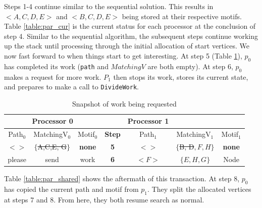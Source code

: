 \documentclass[12pt,twoside]{reedthesis}
\begin{document}
Steps 1-4 continue similar to the sequential solution. This results in $<A,C,D,E>$ and $<B,C,D,E>$ being stored at their respective motifs. Table \ref{table:par_cur} is the current status for each processor at the conclusion of step 4. Similar to the sequential algorithm, the subsequent steps continue working up the stack until processing through the initial allocation of start vertices. We now fast forward to when things start to get interesting. At step 5 (Table \ref{table:par_ws}), $p_{0}$ has completed its work (\texttt{path} and $MatchingV$ are both empty). At step 6, $p_0$ makes a request for more work. $P_1$ then stops its work, stores its current state, and prepares to make a call to \texttt{DivideWork}.

\begin{table}[h!]
\begin{tabular}{ |c c c| c | c c c |}
	 \hline
 	\multicolumn{3}{|c|}{Processor 0} &  & Processor 1\\
 	\hline
	 Path$_{0}$ & MatchingV$_{0}$ & Motif$_{0}$ & \textbf{Step} & Path$_{1}$ & MatchingV$_{1}$ & Motif$_{1}$ \\
 	\hline
	$<  >$ & $\{$\sout{A,C,E, G}$\}$ & \textbf{none} &\textbf{5}& $<  >$ & $\{$\sout{B, D}$, F, H\}$ & \textbf{none} \\
	please & send & work &\textbf{6}& $<F>$ & $\{E,H,G\}$ & Node \\
	 \hline
\end{tabular}
 \caption{Snapshot of work being requested}
\label{table:par_ws}
\end{table}

Table \ref{table:par_shared}  shows the aftermath of this transaction. At step 8, $p_0$ has copied the current path and motif from $p_1$. They split the allocated vertices at steps 7 and 8. From here, they both resume search as normal.
\end{document}
